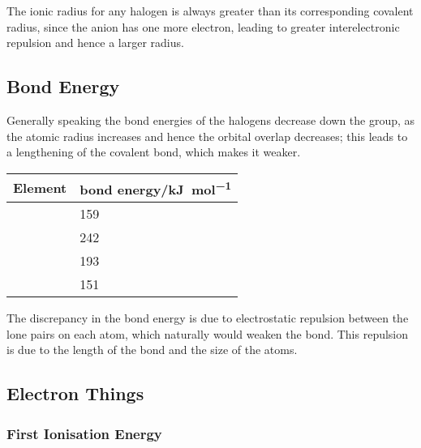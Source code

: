 			The ionic radius for any halogen is always greater than its corresponding covalent radius, since the anion has one more electron,
			leading to greater interelectronic repulsion and hence a larger radius.




		\pagebreak
		\subsection{Bond Energy}

			Generally speaking the bond energies of the halogens decrease down the group, as the atomic radius increases and hence the
			orbital overlap decreases; this leads to a lengthening of the covalent bond, which makes it weaker.

			\begin{center}\begin{table}[htb]\renewcommand{\arraystretch}{1.5}
			\begin{tabu} to \textwidth {X[c,m] | X[c,m]}

				Element		&	 bond energy/\si{\kilo\joule\per\mole}\\	\hline
						&	\num{159}										\\	\hline
				\ch{\Cl}	&	\num{242}										\\	\hline
						&	\num{193}										\\	\hline
						&	\num{151}										\\	\hline

			\end{tabu}
			\end{table}\end{center}\vspace{-10mm}

			The discrepancy in the  bond energy is due to electrostatic repulsion between the lone pairs on each  atom, which
			naturally would weaken the bond. This repulsion is due to the length of the bond and the size of the atoms.



		\subsection{Electron Things}

			\subsubsection{First Ionisation Energy}

